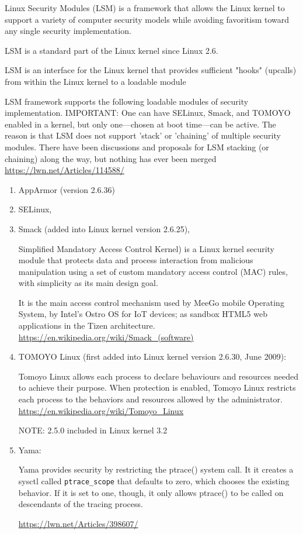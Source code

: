 Linux Security Modules (LSM) is a framework that allows the Linux kernel to
support a variety of computer security models while avoiding favoritism toward
any single security implementation.

LSM is a standard part of the Linux kernel since Linux 2.6. 

LSM is an interface for the Linux kernel that provides sufficient "hooks"
(upcalls) from within the Linux kernel to a loadable module


LSM framework supports the following loadable modules of security
implementation.
IMPORTANT: One can have SELinux, Smack, and TOMOYO enabled in a kernel, but only
one—chosen at boot time—can be active. The reason is that LSM does not support
'stack' or 'chaining' of multiple security modules.
There have been discussions and proposals for LSM stacking (or chaining) along
the way, but nothing has ever been merged \url{https://lwn.net/Articles/114588/}


\begin{enumerate}
  \item  AppArmor  (version 2.6.36) 
  
  \item SELinux, 
  
  \item  Smack (added into Linux kernel version 2.6.25),
  
  Simplified Mandatory Access Control Kernel) is a Linux kernel security module
  that protects data and process interaction from malicious manipulation using a
  set of custom mandatory access control (MAC) rules, with simplicity as its
  main design goal.
  
  It is the main access control mechanism used by  MeeGo mobile Operating
  System, by Intel's Ostro OS for IoT devices; as  sandbox HTML5 web
  applications in the Tizen architecture.
  \url{https://en.wikipedia.org/wiki/Smack_(software)}
  
  \item TOMOYO Linux (first added into Linux kernel version 2.6.30, June 2009):
  
  Tomoyo Linux allows each process to declare behaviours and resources needed to
  achieve their purpose.
  When protection is enabled, Tomoyo Linux restricts each process to the
  behaviors and resources allowed by the administrator.
  \url{https://en.wikipedia.org/wiki/Tomoyo_Linux}
  
  NOTE: 2.5.0 included in Linux kernel 3.2
  
  
  \item Yama:
  
  Yama provides security by restricting the ptrace() system call.
  It it creates a sysctl called 
  \verb!ptrace_scope! that defaults to zero, which
  chooses the existing behavior. If it is set to one, though, it only allows
  ptrace() to be called on descendants of the tracing process.
  
  
  \url{https://lwn.net/Articles/398607/}
  
\end{enumerate}
 

